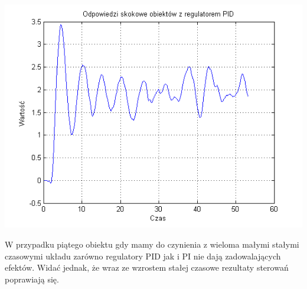 \documentclass[10pt,a4paper]{article}
\begin{document}
\includegraphics[scale=1]{images/cztery/skrypt_10.png}\\
\newpage

W przypadku piątego obiektu gdy mamy do czynienia z wieloma małymi stałymi czasowymi układu zarówno regulatory PID jak i PI nie dają zadowalających efektów. Widać jednak, że wraz ze wzrostem stałej czasowe rezultaty sterowań poprawiają się.
\newpage
\end{document}
